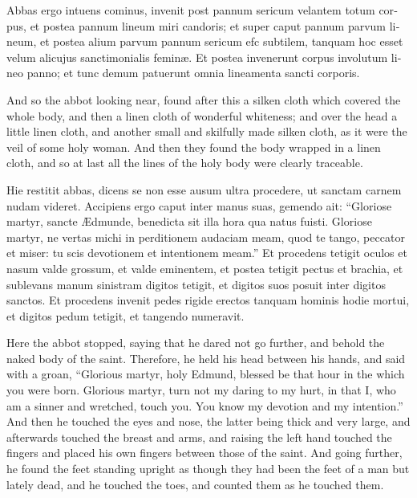 \documentclass[10pt]{book}
\begin{document}
\begin{paracol}{2}
\switchcolumn*

\begin{otherlanguage}{latin}
Abbas ergo intuens cominus, invenit post pannum sericum velantem totum corpus, et postea pannum lineum miri candoris; et super caput pannum parvum lineum, et postea alium parvum pannum sericum efc subtilem, tanquam hoc esset velum alicujus sanctimonialis femin\ae{}. Et postea invenerunt corpus involutum lineo panno; et tunc demum patuerunt omnia lineamenta sancti corporis.
\end{otherlanguage}

\switchcolumn

And so the abbot looking near, found after this a silken cloth which covered the whole body, and then a linen cloth of wonderful whiteness; and over the head a little linen cloth, and another small and skilfully made silken cloth, as it were the veil of some holy woman. And then they found the body wrapped in a linen cloth, and so at last all the lines of the holy body were clearly traceable.

\switchcolumn*

\begin{otherlanguage}{latin}
Hie restitit abbas, dicens se non esse ausum ultra procedere, ut sanctam carnem nudam videret. Accipiens ergo caput inter manus suas, gemendo ait: ``Gloriose martyr, sancte \AE{}dmunde, benedicta sit illa hora qua natus fuisti. Gloriose martyr, ne vertas michi in perditionem audaciam meam, quod te tango, peccator et miser: tu scis devotionem et intentionem meam.'' Et procedens tetigit oculos et nasum valde grossum, et valde eminentem, et postea tetigit pectus et brachia, et sublevans manum sinistram digitos tetigit, et digitos suos posuit inter digitos sanctos. Et procedens invenit pedes rigide erectos tanquam hominis hodie mortui, et digitos pedum tetigit, et tangendo numeravit. 
\end{otherlanguage}

\switchcolumn

Here the abbot stopped, saying that he dared not go further, and behold the naked body of the saint. Therefore, he held his head between his hands, and said with a groan, ``Glorious martyr, holy Edmund, blessed be that hour in the which you were born. Glorious martyr, turn not my daring to my hurt, in that I, who am a sinner and wretched, touch you. You know my devotion and my intention.'' And then he touched the eyes and nose, the latter being thick and very large, and afterwards touched the breast and arms, and raising the left hand touched the fingers and placed his own fingers between those of the saint. And going further, he found the feet standing upright as though they had been the feet of a man but lately dead, and he touched the toes, and counted them as he touched them.


\end{paracol}
\end{document}
